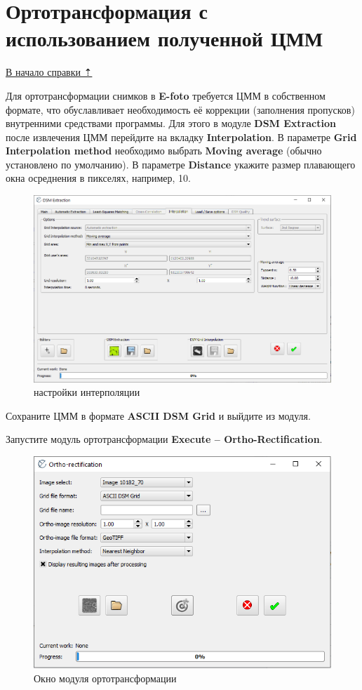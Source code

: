 \documentclass[
  12pt,
]{book}
\begin{document}
\hypertarget{dem-orthorectification}{%
\section{Ортотрансформация с использованием полученной ЦММ}\label{dem-orthorectification}}

\protect\hyperlink{dem}{В начало справки ⇡}

Для ортотрансформации снимков в \textbf{E-foto} требуется ЦММ в собственном формате, что обуславливает необходимость её коррекции (заполнения пропусков) внутренними средствами программы. Для этого в модуле \textbf{DSM Extraction} после извлечения ЦММ перейдите на вкладку \textbf{Interpolation}. В параметре \textbf{Grid Interpolation method} необходимо выбрать \textbf{Moving average} (обычно установлено по умолчанию). В параметре \textbf{Distance} укажите размер плавающего окна осреднения в пикселях, например, 10.

\begin{figure}
\centering
\includegraphics{images/Ref14/Interpolation.png}
\caption{настройки интерполяции}
\end{figure}

Сохраните ЦММ в формате \textbf{ASCII DSM Grid} и выйдите из модуля.

Запустите модуль ортотрансформации \textbf{Execute -- Ortho-Rectification}.

\begin{figure}
\centering
\includegraphics{images/Ref14/Orthorectification.png}
\caption{Окно модуля ортотрансформации}
\end{figure}
\end{document}
